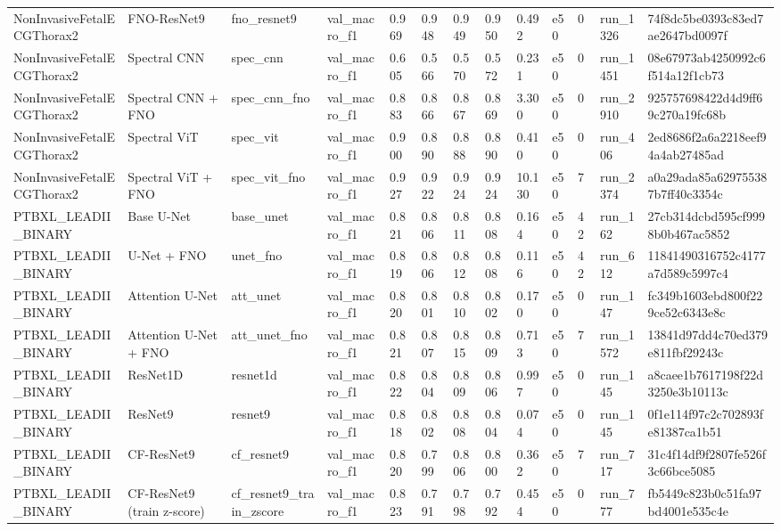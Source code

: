 \begin{longtable}{lllllllllllll}
NonInvasiveFetalECGThorax2 & FNO-ResNet9 & fno\_resnet9 & val\_macro\_f1 & 0.969 & 0.948 & 0.949 & 0.950 & 0.492 & e50 & 0 & run\_1326 & 74f8dc5be0393c83ed7ae2647bd0097f \\
NonInvasiveFetalECGThorax2 & Spectral CNN & spec\_cnn & val\_macro\_f1 & 0.605 & 0.566 & 0.570 & 0.572 & 0.231 & e50 & 0 & run\_1451 & 08e67973ab4250992c6f514a12f1cb73 \\
NonInvasiveFetalECGThorax2 & Spectral CNN + FNO & spec\_cnn\_fno & val\_macro\_f1 & 0.883 & 0.866 & 0.867 & 0.869 & 3.300 & e50 & 0 & run\_2910 & 925757698422d4d9ff69c270a19fc68b \\
NonInvasiveFetalECGThorax2 & Spectral ViT & spec\_vit & val\_macro\_f1 & 0.900 & 0.890 & 0.888 & 0.890 & 0.410 & e50 & 0 & run\_406 & 2ed8686f2a6a2218eef94a4ab27485ad \\
NonInvasiveFetalECGThorax2 & Spectral ViT + FNO & spec\_vit\_fno & val\_macro\_f1 & 0.927 & 0.922 & 0.924 & 0.924 & 10.130 & e50 & 7 & run\_2374 & a0a29ada85a629755387b7ff40c3354c \\
PTBXL\_LEADII\_BINARY & Base U-Net & base\_unet & val\_macro\_f1 & 0.821 & 0.806 & 0.811 & 0.808 & 0.164 & e50 & 42 & run\_162 & 27cb314dcbd595cf9998b0b467ac5852 \\
PTBXL\_LEADII\_BINARY & U-Net + FNO & unet\_fno & val\_macro\_f1 & 0.819 & 0.806 & 0.812 & 0.808 & 0.116 & e50 & 42 & run\_612 & 11841490316752c4177a7d589c5997c4 \\
PTBXL\_LEADII\_BINARY & Attention U-Net & att\_unet & val\_macro\_f1 & 0.820 & 0.801 & 0.810 & 0.802 & 0.170 & e50 & 0 & run\_147 & fc349b1603ebd800f229ce52c6343e8c \\
PTBXL\_LEADII\_BINARY & Attention U-Net + FNO & att\_unet\_fno & val\_macro\_f1 & 0.821 & 0.807 & 0.815 & 0.809 & 0.713 & e50 & 7 & run\_1572 & 13841d97dd4c70ed379e811fbf29243c \\
PTBXL\_LEADII\_BINARY & ResNet1D & resnet1d & val\_macro\_f1 & 0.822 & 0.804 & 0.809 & 0.806 & 0.997 & e50 & 0 & run\_145 & a8caee1b7617198f22d3250e3b10113c \\
PTBXL\_LEADII\_BINARY & ResNet9 & resnet9 & val\_macro\_f1 & 0.818 & 0.802 & 0.808 & 0.804 & 0.074 & e50 & 0 & run\_145 & 0f1e114f97c2c702893fe81387ca1b51 \\
PTBXL\_LEADII\_BINARY & CF-ResNet9 & cf\_resnet9 & val\_macro\_f1 & 0.820 & 0.799 & 0.806 & 0.800 & 0.362 & e50 & 7 & run\_717 & 31c4f14df9f2807fe526f3c66bce5085 \\
PTBXL\_LEADII\_BINARY & CF-ResNet9 (train z-score) & cf\_resnet9\_train\_zscore & val\_macro\_f1 & 0.823 & 0.791 & 0.798 & 0.792 & 0.454 & e50 & 0 & run\_777 & fb5449c823b0c51fa97bd4001e535c4e \\

\end{longtable}
